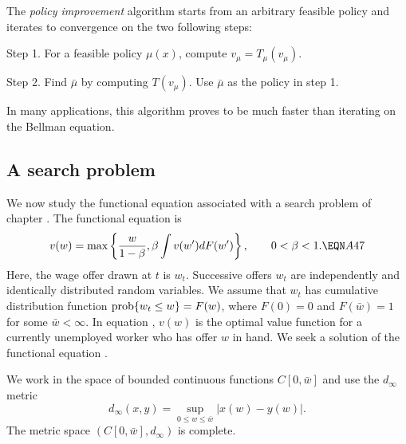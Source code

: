 The {\it policy improvement\/} algorithm starts from an
arbitrary feasible policy and  iterates to convergence
on the two following steps:

Step 1. For a feasible policy $\mu(x)$, compute
$ v_{\mu} = T_{\mu}(v_{\mu})$.

Step 2. Find ${\bar \mu}$ by computing $T(v_{\mu})$.  Use $\bar \mu$
as the policy in step 1.

\noindent In many applications, this algorithm proves to be much faster
than iterating on the Bellman equation.

\subsection{A search problem}

We now study the functional equation associated with a search problem of
chapter .  The functional equation is
$$v(w)=\max \left\{ {w\over 1-\be}, \be \int v(w') dF(w')\right\}, \qquad 0<\be
<1. \EQN A47 $$
Here, the wage offer drawn at $t$ is $w_t$.  Successive offers $w_t$ are
independently and identically distributed random variables.  We assume that
$w_t$ has cumulative distribution function ${\rm prob}\{w_t\le w\}=F(w)$, where
$F(0)=0$ and $F(\bar w) =1$ for some $\bar w<\infty$.  In equation , $v(w)$ is the
optimal value function for a currently unemployed worker who has offer $w$ in
hand.  We seek a solution of the functional equation .

We work in the space of bounded continuous functions $C[0,\bar w]$ and use the
$d_\infty$ metric
$$d_\infty(x,y) =\sup_{0\le w\le \bar w} |x(w)-y(w)|.$$
The metric space $(C[0,\bar w],d_\infty)$ is complete.

